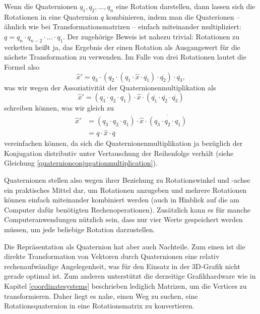 Wenn die Quaternionen $q_1, q_2, \ldots, q_n$ eine Rotation darstellen, dann lassen sich die Rotationen in eine Quaternion $q$ kombinieren, indem man die Quaterionen -- ähnlich wie bei Transformationsmatrizen -- einfach miteinander multipliziert: $q = q_n \cdot q_{n-2} \cdot \ldots \cdot q_1$. Der zugehörige Beweis ist nahezu trivial: Rotationen zu verketten heißt ja, das Ergebnis der einen Rotation als Ausgangswert für die nächste Transformation zu verwenden. Im Falle von drei Rotationen lautet die Formel also
\begin{equation}
 \hat{x}' = q_3 \cdot ( q_2 \cdot ( q_1 \cdot \hat{x} \cdot \overline{q_1} ) \cdot \overline{q_2} ) \cdot \overline{q_3},
\end{equation}
was wir wegen der Assoziativität der Quaternionenmultiplikation als 
\begin{equation}
 \hat{x}' = ( q_3 \cdot q_2 \cdot q_1 ) \cdot \hat{x} \cdot ( \overline{q_1} \cdot \overline{q_2} \cdot \overline{q_3} )
\end{equation}
schreiben können, was wir gleich zu
\begin{equation}
\begin{split}
 \hat{x}' &= ( q_3 \cdot q_2 \cdot q_1 ) \cdot \hat{x} \cdot \overline{( q_3 \cdot q_2 \cdot q_1 )} \\
 &= q \cdot \hat{x} \cdot \overline{q}
\end{split}
\end{equation} 
vereinfachen können, da sich die Quaternionenmultiplikation ja bezüglich der Konjugation distributiv unter Vertauschung der Reihenfolge verhält (siehe Gleichung \ref{quaternionconjugationmultiplication}).

Quaternionen stellen also wegen ihrer Beziehung zu Rotationswinkel und -achse ein praktisches Mittel dar, um Rotationen anzugeben und mehrere Rotationen können einfach miteinander kombiniert werden (auch in Hinblick auf die am Computer dafür benötigten Rechenoperationen). Zusätzlich kann es für manche Computeranwendungen nützlich sein, dass nur vier Werte gespeichert werden müssen, um jede beliebige Rotation darzustellen. 

Die Repräsentation als Quaternion hat aber auch Nachteile. Zum einen ist die direkte Transformation von Vektoren durch Quaternionen eine relativ rechenaufwändige Angelegenheit, was für den Einsatz in der 3D-Grafik nicht gerade optimal ist. Zum anderen unterstützt die derzeitige Grafikhardware wie in Kapitel \ref{coordinatesystems} beschrieben lediglich Matrizen, um die Vertices zu transformieren. Daher liegt es nahe, einen Weg zu suchen, eine Rotationsquaternion in eine Rotationsmatrix zu konvertieren. 

